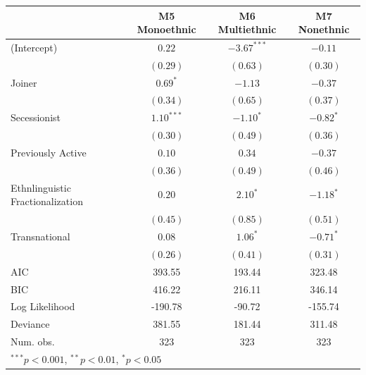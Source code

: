 \documentclass[12pt,]{book}
\let\origtable\table
\let\endorigtable\endtable
\renewenvironment{table}[1][2] {
    \singlespacing
    \expandafter\origtable\expandafter[H]
} {
    \endorigtable
}
\theoremstyle{definition}
\theoremstyle{definition}
\theoremstyle{definition}
\theoremstyle{remark}
\begin{document}
\begin{table}
\begin{center}
\begin{tabular}{l c c c }
\hline
 & M5 Monoethnic & M6 Multiethnic & M7 Nonethnic \\
\hline
(Intercept)                      & $0.22$       & $-3.67^{***}$ & $-0.11$     \\
                                 & $(0.29)$     & $(0.63)$      & $(0.30)$    \\
Joiner                           & $0.69^{*}$   & $-1.13$       & $-0.37$     \\
                                 & $(0.34)$     & $(0.65)$      & $(0.37)$    \\
Secessionist                     & $1.10^{***}$ & $-1.10^{*}$   & $-0.82^{*}$ \\
                                 & $(0.30)$     & $(0.49)$      & $(0.36)$    \\
Previously Active                & $0.10$       & $0.34$        & $-0.37$     \\
                                 & $(0.36)$     & $(0.49)$      & $(0.46)$    \\
Ethnlinguistic Fractionalization & $0.20$       & $2.10^{*}$    & $-1.18^{*}$ \\
                                 & $(0.45)$     & $(0.85)$      & $(0.51)$    \\
Transnational                    & $0.08$       & $1.06^{*}$    & $-0.71^{*}$ \\
                                 & $(0.26)$     & $(0.41)$      & $(0.31)$    \\
\hline
AIC                              & 393.55       & 193.44        & 323.48      \\
BIC                              & 416.22       & 216.11        & 346.14      \\
Log Likelihood                   & -190.78      & -90.72        & -155.74     \\
Deviance                         & 381.55       & 181.44        & 311.48      \\
Num. obs.                        & 323          & 323           & 323         \\
\hline
\multicolumn{4}{l}{\scriptsize{$^{***}p<0.001$, $^{**}p<0.01$, $^*p<0.05$}}
\end{tabular}
\caption{Logit Models of Rebel Group Ethnic Composition}
\label{tab:comp}
\end{center}
\end{table}
\end{document}
